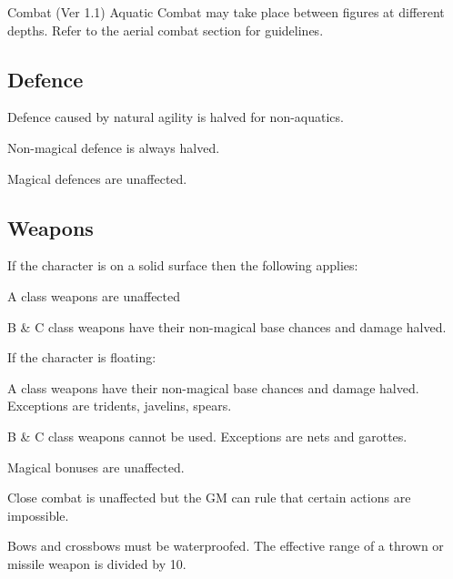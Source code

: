 \begin{Chapter}{Combat (Ver 1.1)}
Aquatic Combat may take place between figures at different
depths. Refer to the aerial combat section for guidelines.

\subsection{Defence}

\begin{Itemize}
\item Defence caused by natural agility is halved for non-aquatics.

\item Non-magical defence is always halved.  

\item Magical defences are unaffected. 

\end{Itemize}

\subsection{Weapons}

If the character is on a solid surface then the following applies:

\begin{Itemize}
  
\item A class weapons are unaffected  

\item B \& C class weapons have their non-magical base 
chances and damage halved. 

\end{Itemize}

If the character is floating:  

\begin{Itemize}

\item A class weapons have their non-magical base chances and damage
  halved.  Exceptions are tridents, javelins, spears.

\item B \& C class weapons cannot be used. Exceptions are nets and
  garottes.

\end{Itemize}

Magical bonuses are unaffected. 

Close combat is unaffected but the GM can rule that certain actions
are impossible.

Bows and crossbows must be waterproofed.  The effective range of a
thrown or missile weapon is divided by 10.


\end{Chapter}
